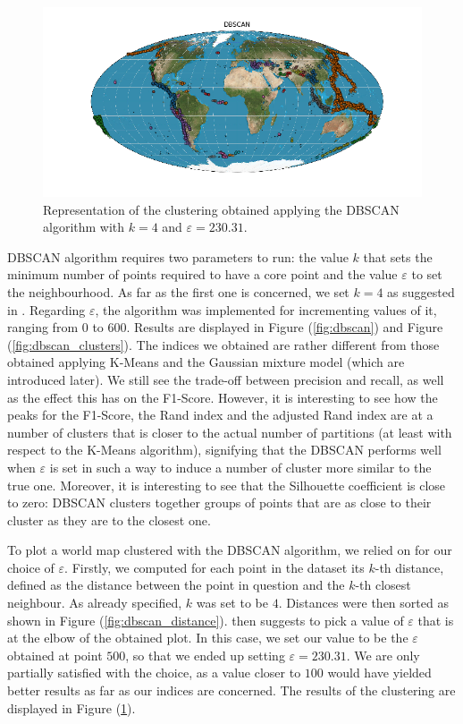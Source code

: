 \documentclass[a4paper]{article}
\begin{document}
	 \begin{figure}
		\includegraphics[width=\linewidth]{DBSCAN.png}
		\caption{Representation of the clustering obtained applying the DBSCAN algorithm with $k= 4$ and $\varepsilon = 230.31$.}
		\label{fig:dbscan_world}
	\end{figure}
	DBSCAN algorithm requires two parameters to run: the value $k$ that sets the minimum number of points required to have a core point and the value $\varepsilon$ to set the neighbourhood. As far as the first one is concerned, we set $k=4$ as suggested in \cite{Ester96adensity-based}.
	Regarding $\varepsilon$, the algorithm was implemented for incrementing values of it, ranging from $0$ to $600$. Results are displayed in Figure (\ref{fig:dbscan}) and Figure (\ref{fig:dbscan_clusters}).
	The indices we obtained are rather different from those obtained applying K-Means and the Gaussian mixture model (which are introduced later). We still see the trade-off between precision and recall, as well as the effect this has on the F1-Score. However, it is interesting to see how the peaks for the F1-Score, the Rand index and the adjusted Rand index are at a number of clusters that is closer to the actual number of partitions (at least with respect to the K-Means algorithm), signifying that the DBSCAN performs well when $\varepsilon$ is set in such a way to induce a number of cluster more similar to the true one. Moreover, it is interesting to see that the Silhouette coefficient is close to zero: DBSCAN clusters together groups of points that are as close to their cluster as they are to the closest one.
	
	To plot a world map clustered with the DBSCAN algorithm, we relied on \cite{Ester96adensity-based} for our choice of $\varepsilon$.
	Firstly, we computed for each point in the dataset its $k$-th distance, defined as the distance between the point in question and the $k$-th closest neighbour. As already specified, $k$ was set to be $4$. Distances were then sorted as shown in Figure (\ref{fig:dbscan_distance}).
	\cite{Ester96adensity-based} then suggests to pick a value of $\varepsilon$ that is at the elbow of the obtained plot. In this case, we set our value to be the $\varepsilon$ obtained at point $500$, so that we ended up setting $\varepsilon= 230.31$. We are only partially satisfied with the choice, as a value closer to $100$ would have yielded better results as far as our indices are concerned. The results of the clustering are displayed in Figure (\ref{fig:dbscan_world}).
	
\end{document}
